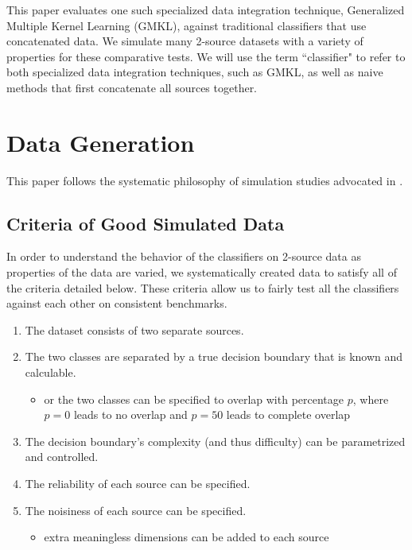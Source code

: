 \documentclass{article}
\begin{document}
This paper evaluates one such specialized data integration technique,
Generalized Multiple Kernel Learning (GMKL), against traditional classifiers
that use concatenated data. We simulate many 2-source datasets with a variety
of properties for these comparative tests. We will use the term ``classifier"
to refer to both specialized data integration techniques, such as GMKL, as well
as naive methods that first concatenate all sources together.












\section*{Data Generation}

This paper follows the systematic philosophy of simulation studies advocated in
\cite{neto2014simulation}.


\subsection*{Criteria of Good Simulated Data}

In order to understand the behavior of the classifiers on 2-source data as
properties of the data are varied, we systematically created data to satisfy
all of the criteria detailed below. These criteria allow us to fairly test all
the classifiers against each other on consistent benchmarks.
\newline

\begin{minipage}{\textwidth}
\centering
\begin{enumerate}
    \item The dataset consists of two separate sources.
    \item \label{itm:separable} The two classes are separated by a true
        decision boundary that is known and calculable.
    \begin{itemize}
        \item or the two classes can be specified to overlap with percentage
            $p$, where $p=0$ leads to no overlap and $p=50$ leads to complete
            overlap
    \end{itemize}
    \item The decision boundary's complexity (and thus difficulty) can be
        parametrized and controlled.
    \item The reliability of each source can be specified.
    \item The noisiness of each source can be specified.
    \begin{itemize}
        \item \label{itm:noisy} extra meaningless dimensions can be
            added to each source
    \end{itemize}
\end{enumerate}
\label{tab:criteria}
\end{minipage}
\end{document}
